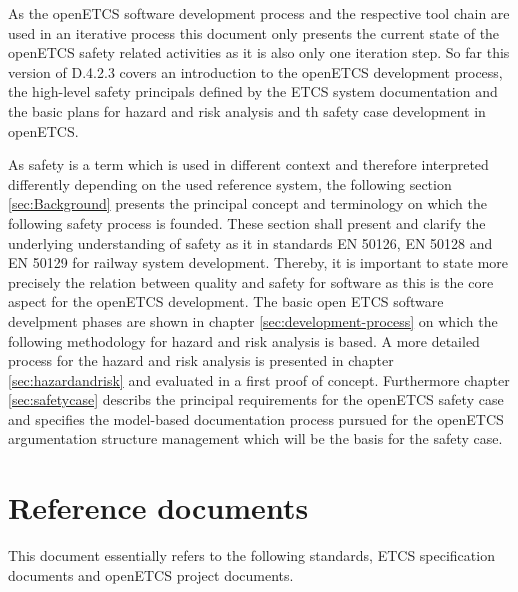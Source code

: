 \documentclass{template/openetcs_report}
\begin{document}
As the openETCS software development process and the respective tool chain are used in an iterative process this document only presents the current state of the openETCS safety related activities as it is also only one iteration step. So far this version of D.4.2.3 covers an introduction to the openETCS development process, the high-level safety principals defined by the ETCS system documentation and the basic plans for hazard and risk analysis and th safety case development in openETCS. 

As safety is a term which is used in different context and therefore interpreted differently depending on the used reference system, the following section \ref{sec:Background} presents the principal concept and terminology on which the following safety process is founded. These section shall present and clarify the underlying understanding of safety as it in standards EN 50126, EN 50128 and EN 50129 for railway system development. Thereby, it is important to state more precisely the relation between quality and safety for software as this is the core aspect for the openETCS development. The basic open ETCS software develpment phases are shown in chapter \ref{sec:development-process} on which the following methodology for hazard and risk analysis is based. A more detailed process for the hazard and risk analysis is presented in chapter \ref{sec:hazardandrisk}  and evaluated in a first proof of concept. Furthermore chapter \ref{sec:safetycase} describs the principal requirements for the openETCS safety case and specifies the model-based documentation process pursued for the openETCS argumentation structure management which will be the basis for the safety case. 



\section{Reference documents}
\label{sec:refdoc}

This document essentially refers to the following standards, ETCS specification documents and openETCS project documents.
\end{document}
